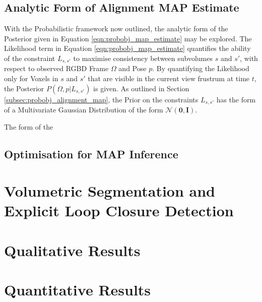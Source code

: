 \subsection{Analytic Form of Alignment MAP Estimate}
\label{subsec:probobj_analytic_alignment_map}
With the Probabilistic framework now outlined, the analytic form of the
Posterior given in Equation \ref{eqn:probobj_map_estimate} may be explored. The
Likelihood term in Equation \ref{eqn:probobj_map_estimate} quantifies the
ability of the constraint $L_{s, s'}$ to maximise consistency between subvolumes
$s$ and $s'$, with respect to observed RGBD Frame $\Omega$ and Pose $p$. By
quantifying the Likelihood only for Voxels in $s$ and $s'$ that are visible in
the current view frustrum at time $t$, the Posterior $P(\Omega, p | L_{s, s'})$
is given. As outlined in Section \ref{subsec:probobj_alignment_map}, the Prior
on the constraints $L_{s, s'}$ has the form of a Multivariate Gaussian
Distribution of the form $\mathcal{N}(\mathbf{0}, \mathbf{I})$.

The form of the 

\subsection{Optimisation for MAP Inference}
\label{subsec:probobj_map_optimisation}

\section{Volumetric Segmentation and Explicit Loop Closure Detection}

\section{Qualitative Results}

\section{Quantitative Results}